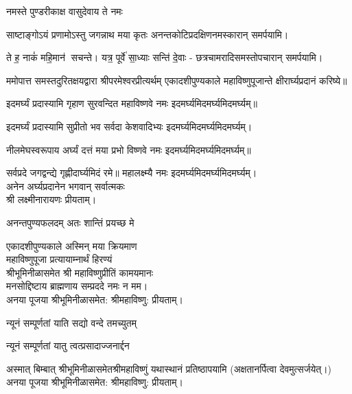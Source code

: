 \begin{center}
{नमस्ते पुण्डरीकाक्ष वासुदेवाय ते नमः}

{साष्टाङ्गोऽयं प्रणामोऽस्तु जगन्नाथ मया कृतः}
अनन्तकोटिप्रदक्षिणनमस्कारान् समर्पयामि।\medskip

{ते ह॒ नाकं॑ महि॒मान॑ सचन्ते। यत्र॒ पूर्वे॑ सा॒ध्याः सन्ति॑ दे॒वाः}
- छत्रचामरादिसमस्तोपचारान् समर्पयामि।\medskip

ममोपात्त समस्तदुरितक्षयद्वारा श्रीपरमेश्वरप्रीत्यर्थम् एकादशीपुण्यकाले  महाविष्णुपूजान्ते क्षीरार्घ्यप्रदानं करिष्ये॥
\medskip

{इदमर्घ्यं प्रदास्यामि गृहाण सुरवन्दित}
	महाविष्णवे नमः इदमर्घ्यमिदमर्घ्यमिदमर्घ्यम्॥\medskip

{इदमर्घ्यं प्रदास्यामि सुप्रीतो भव सर्वदा}
	केशवादिभ्यः इदमर्घ्यमिदमर्घ्यमिदमर्घ्यम्।\medskip

{नीलमेघस्वरूपाय अर्घ्यं दत्तं मया प्रभो}
	विष्णवे नमः इदमर्घ्यमिदमर्घ्यमिदमर्घ्यम्॥\medskip

{सर्वप्रदे जगद्वन्द्ये गृह्णीदार्घ्यमिदं रमे॥}
	महालक्ष्म्यै नमः इदमर्घ्यमिदमर्घ्यमिदमर्घ्यम्।\\
अनेन अर्घ्यप्रदानेन भगवान् सर्वात्मकः\\ श्री लक्ष्मीनारायणः प्रीयताम्।\medskip

{अनन्तपुण्यफलदम् अतः शान्तिं प्रयच्छ मे}

एकादशीपुण्यकाले अस्मिन् मया क्रियमाण\\
महाविष्णुपूजा प्रत्यायाम्नार्थं हिरण्यं\\
श्रीभूमिनीळासमेत श्री महाविष्णुप्रीतिं कामयमानः\\
मनसोद्दिष्टाय ब्राह्मणाय सम्प्रददे नमः न मम।\\ 
अनया पूजया श्रीभूमिनीळासमेत: श्रीमहाविष्णु: प्रीयताम्। 
 
{न्यूनं सम्पूर्णतां याति सद्यो वन्दे तमच्युतम्}

{न्यूनं सम्पूर्णतां यातु त्वत्प्रसादाज्जनार्द्दन}\medskip

अस्मात् बिम्बात् श्रीभूमिनीळासमेतश्रीमहाविष्णुं यथास्थानं प्रतिष्ठापयामि (अक्षतानर्पित्वा देवमुत्सर्जयेत्।)\\
अनया पूजया श्रीभूमिनीळासमेत: श्रीमहाविष्णु: प्रीयताम्।\medskip


\end{center}
